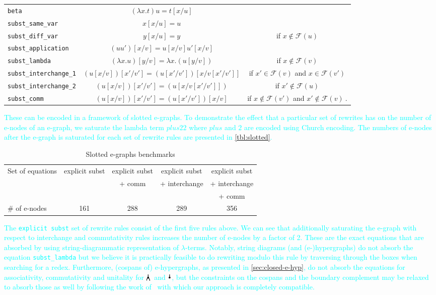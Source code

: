 \begin{tabular}{lcc}
	\texttt{beta} & $(\lambda x . t) u = t[x / u]$&\\
	\texttt{subst\_same\_var} & $x[x / u] = u$ &\\
	\texttt{subst\_diff\_var} & $y[x / u] = y$ & if $x \not \in \mathcal{F}(u)$\\
	\texttt{subst\_application} & $(uu')[x / v] = u[x / v]u'[x / v]$ & \\
	\texttt{subst\_lambda} & $(\lambda x . u)[y / v] = \lambda x . (u[y / v])$ & if $x \not \in \mathcal{F}(v)$ \\
	\texttt{subst\_interchange\_1} & $(u[x / v])[x' / v'] = (u[x' / v'])[x / v[x' / v']]$ & if $x' \in \mathcal{F}(v)$ and $x \in \mathcal{F}(v')$\\
	\texttt{subst\_interchange\_2} & $(u[x / v])[x' / v'] = (u[x / v[x' / v']])$ & if $x' \not \in \mathcal{F}(u)$\\
	\texttt{subst\_comm} & $(u[x / v])[x' / v'] = (u[x' / v'])[x / v]$ & if $x \not \in \mathcal{F}(v')$ and $x' \not \in \mathcal{F}(v)~.$\\
\end{tabular}
	
\textcolor{cyan}{These can be encoded in a framework of slotted e-graphs.
To demonstrate the effect that a particular set of rewrites has on the number of e-nodes of an e-graph, we saturate the lambda term $plus 2 2$ where $plus$ and $2$ are encoded using Church encoding.
The numbers of e-nodes after the e-graph is saturated for each set of rewrite rules are presented in \autoref{tbl:slotted}.
}

\begin{table}
	\begin{tabular}{lcccc}
	  Set of equations & explicit subst & explicit subst & explicit subst & explicit subst\\
	  && + comm& + interchange&  + interchange\\
	  &&&&  + comm\\
	  \# of e-nodes & 161 & 288 & 289 & 356
	\end{tabular}
	\caption{Slotted e-graphs benchmarks}
	\label{tbl:slotted}
\end{table}

\textcolor{cyan}{The \texttt{explicit subst} set of rewrite rules consist of the first five rules above.
We can see that additionally saturating the e-graph with respect to interchange and commutativity rules increases the number of e-nodes by a factor of 2.
These are the exact equations that are absorbed by using string-diagrammatic representation of $\lambda$-terms.
Notably, string diagrams (and (e-)hypergraphs) do not absorb the equation \texttt{subst\_lambda} but we believe it is practically feasible to do rewriting modulo this rule by traversing through the boxes when searching for a redex.
Furthermore, (cospans of) e-hypergraphs, as presented in \autoref{sec:closed-e-hyp}, do not absorb the equations for associativity, commutativity and unitality for $\comonoid$ and $\counit$, but the constraints on the cospans and the boundary complement may be relaxed to absorb those as well by following the work of~\cite{zanassi_comonoid} with which our approach is completely compatible.}
	

